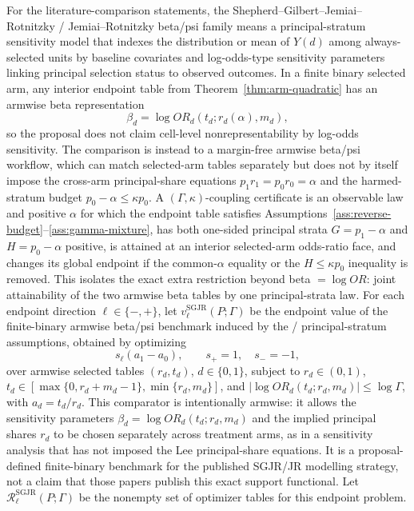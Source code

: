 \documentclass[11pt]{article}
\theoremstyle{definition}
\theoremstyle{plain}
\theoremstyle{remark}
\begin{document}
For the literature-comparison statements, the Shepherd--Gilbert--Jemiai--Rotnitzky / Jemiai--Rotnitzky beta/psi family means a principal-stratum sensitivity model that indexes the distribution or mean of \(Y(d)\) among always-selected units by baseline covariates and log-odds-type sensitivity parameters linking principal selection status to observed outcomes.  In a finite binary selected arm, any interior endpoint table from Theorem~\ref{thm:arm-quadratic} has an armwise beta representation
\[
  \beta_d=\log OR_d(t_d;r_d(\alpha),m_d),
\]
so the proposal does not claim cell-level nonrepresentability by log-odds sensitivity.  The comparison is instead to a margin-free armwise beta/psi workflow, which can match selected-arm tables separately but does not by itself impose the cross-arm principal-share equations \(p_1 r_1=p_0 r_0=\alpha\) and the harmed-stratum budget \(p_0-\alpha\le \kappa p_0\).  A \((\Gamma,\kappa)\)-coupling certificate is an observable law and positive \(\alpha\) for which the endpoint table satisfies Assumptions~\ref{ass:reverse-budget}--\ref{ass:gamma-mixture}, has both one-sided principal strata \(G=p_1-\alpha\) and \(H=p_0-\alpha\) positive, is attained at an interior selected-arm odds-ratio face, and changes its global endpoint if the common-\(\alpha\) equality or the \(H\le \kappa p_0\) inequality is removed.  This isolates the exact extra restriction beyond beta \(=\log OR\): joint attainability of the two armwise beta tables by one principal-strata law.
For each endpoint direction \(\ell\in\{-,+\}\), let \(v_\ell^{\mathrm{SGJR}}(P;\Gamma)\) be the endpoint value of the finite-binary armwise beta/psi benchmark induced by the \citet{ShepherdGilbertJemiaiRotnitzky2006} / \citet{JemiaiRotnitzkyShepherdGilbert2007} principal-stratum assumptions, obtained by optimizing
\[
  s_\ell(a_1-a_0),\qquad s_+=1,\quad s_-=-1,
\]
over armwise selected tables \((r_d,t_d)\), \(d\in\{0,1\}\), subject to \(r_d\in(0,1)\), \(t_d\in[\max\{0,r_d+m_d-1\},\min\{r_d,m_d\}]\), and \(|\log OR_d(t_d;r_d,m_d)|\le \log \Gamma\), with \(a_d=t_d/r_d\).  This comparator is intentionally armwise: it allows the sensitivity parameters \(\beta_d=\log OR_d(t_d;r_d,m_d)\) and the implied principal shares \(r_d\) to be chosen separately across treatment arms, as in a sensitivity analysis that has not imposed the Lee principal-share equations.  It is a proposal-defined finite-binary benchmark for the published SGJR/JR modelling strategy, not a claim that those papers publish this exact support functional.  Let \(\mathcal R_\ell^{\mathrm{SGJR}}(P;\Gamma)\) be the nonempty set of optimizer tables for this endpoint problem.
\end{document}
